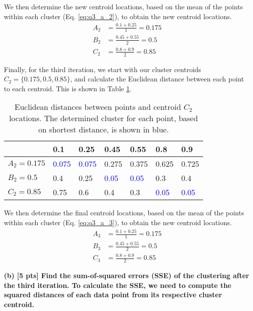 We then determine the new centroid locations, based on the mean of the points within each cluster (Eq. \ref{eq:q3_a_2}), to obtain the new centroid locations.
\begin{align}
  A_2 &= \frac{0.1+0.25}{1} = 0.175 \nonumber \\
  B_2 &= \frac{0.45+0.55}{2} = 0.5 \nonumber \\
  C_2 &= \frac{0.8+0.9}{2} = 0.85\label{eq:q3_a_2}
\end{align}

Finally, for the third iteration, we start with our cluster centroids $C_2 = \{0.175, 0.5, 0.85\}$, and calculate the Euclidean distance between each point to each centroid. This is shown in Table \ref{tbl:q3_a_3}.

\begin{table}[h]
  \centering
  \begin{tabular}{|l|l|l|l|l|l|l|}
    \hline
           & \textbf{0.1} & \textbf{0.25} & \textbf{0.45} & \textbf{0.55} & \textbf{0.8} & \textbf{0.9} \\ \hline
    $A_2 =0.175$ & \textcolor{blue}{0.075} & \textcolor{blue}{0.075} & 0.275 &0.375  &0.625  & 0.725 \\ \hline
    $B_2 =0.5$ & 0.4 & 0.25 & \textcolor{blue}{0.05}  & \textcolor{blue}{0.05} & 0.3  & 0.4 \\ \hline
    $C_2 =0.85$  & 0.75 &0.6  &0.4  &0.3 &\textcolor{blue}{0.05} & \textcolor{blue}{0.05} \\ \hline
  \end{tabular}
  \caption{Euclidean distances between points and centroid $C_2$ locations. The determined cluster for each point, based on shortest distance, is shown in blue.}
  \label{tbl:q3_a_3}
\end{table}

We then determine the final centroid locations, based on the mean of the points within each cluster (Eq. \ref{eq:q3_a_3}), to obtain the new centroid locations.
\begin{align}
  A_3 &= \frac{0.1+0.25}{1} = 0.175 \nonumber \\
  B_3 &= \frac{0.45+0.55}{2} = 0.5 \nonumber \\
  C_3 &= \frac{0.8+0.9}{2} = 0.85\label{eq:q3_a_3}
\end{align}

\textbf{(b) [5 pts] Find the sum-of-squared errors (SSE) of the clustering after the third iteration. To calculate the SSE, we need to compute the squared distances of each data point from its respective cluster centroid.}

